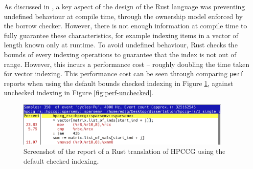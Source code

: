 As discussed in , a key aspect of the design of the Rust language was preventing undefined behaviour at compile time, through the ownership model enforced by the borrow checker. However, there is not enough information at compile time to fully guarantee these characteristics, for example indexing items in a vector of length known only at runtime. To avoid undefined behaviour, Rust checks the bounds of every indexing operations to guarantee that the index is not out of range. However, this incurs a performance cost -- roughly doubling the time taken for vector indexing. This performance cost can be seen through comparing \texttt{perf} reports when using the default bounds checked indexing in Figure \ref{fig:perf-checked}, against unchecked indexing in Figure \ref{fig:perf-unchecked}.

\begin{figure}[H]
    \centering
    \includegraphics[width=0.95\textwidth]{images/5_performance/perf/perf_checked_op.png}
    \caption{Screenshot of the  report of a Rust translation of \acrshort{HPCCG} using the default checked indexing.}
    \label{fig:perf-checked}
\end{figure}

